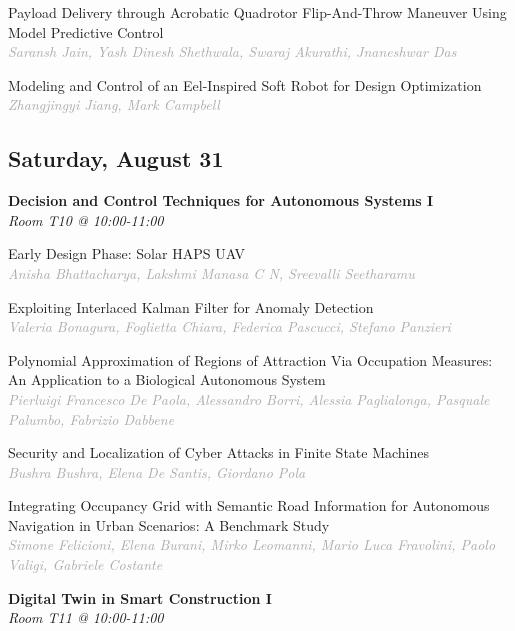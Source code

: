 \begin{multicols*}{2}
\small Payload Delivery through Acrobatic Quadrotor Flip-And-Throw Maneuver Using Model Predictive Control\\ 
\footnotesize \textcolor{darkgray}{\textit{Saransh Jain, Yash Dinesh  Shethwala, Swaraj  Akurathi, Jnaneshwar  Das}}

\small Modeling and Control of an Eel-Inspired Soft Robot for Design Optimization\\ 
\footnotesize \textcolor{darkgray}{\textit{Zhangjingyi Jiang, Mark  Campbell}}

\subsection*{Saturday, August 31}

\normalsize \textbf{Decision and Control Techniques for Autonomous Systems I}\\
\small \textit{Room T10 @ 10:00-11:00}

\small Early Design Phase: Solar HAPS UAV\\ 
\footnotesize \textcolor{darkgray}{\textit{Anisha Bhattacharya, Lakshmi Manasa  C N, Sreevalli  Seetharamu}}

\small Exploiting Interlaced Kalman Filter for Anomaly Detection\\ 
\footnotesize \textcolor{darkgray}{\textit{Valeria Bonagura, Foglietta  Chiara, Federica  Pascucci, Stefano  Panzieri}}

\small Polynomial Approximation of Regions of Attraction Via Occupation Measures: An Application to a Biological Autonomous System\\ 
\footnotesize \textcolor{darkgray}{\textit{Pierluigi Francesco De Paola, Alessandro  Borri, Alessia  Paglialonga, Pasquale  Palumbo, Fabrizio  Dabbene}}

\small Security and Localization of Cyber Attacks in Finite State Machines\\ 
\footnotesize \textcolor{darkgray}{\textit{Bushra Bushra, Elena  De Santis, Giordano  Pola}}

\small Integrating Occupancy Grid with Semantic Road Information for Autonomous Navigation in Urban Scenarios: A Benchmark Study\\ 
\footnotesize \textcolor{darkgray}{\textit{Simone Felicioni, Elena  Burani, Mirko  Leomanni, Mario Luca  Fravolini, Paolo  Valigi, Gabriele  Costante}}

\normalsize \textbf{Digital Twin in Smart Construction I}\\
\small \textit{Room T11 @ 10:00-11:00}


\end{multicols*}
